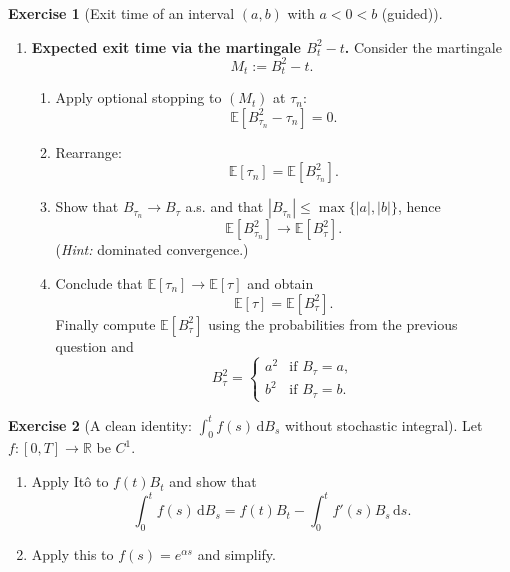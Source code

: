 \documentclass[11pt]{article}
\newcommand{\E}{\mathbb{E}}
\newcommand{\R}{\mathbb{R}}
\newcommand{\1}{\mathbf{1}}
\theoremstyle{definition}
\newtheorem{exercise}{Exercise}[section]
\begin{document}
\begin{exercise}[Exit time of an interval $(a,b)$ with $a<0<b$ (guided)]
\begin{enumerate}[label=\textbf{(\alph*)}, itemsep=0.35em]
\item \textbf{Expected exit time via the martingale $B_t^2-t$.}
Consider the martingale
$$
M_t:=B_t^2-t.
$$
\begin{enumerate}[label=\roman*)]
\item Apply optional stopping to $(M_t)$ at $\tau_n$:
$$
\E[B_{\tau_n}^2-\tau_n]=0.
$$
\item Rearrange:
$$
\E[\tau_n]=\E[B_{\tau_n}^2].
$$
\item Show that $B_{\tau_n}\to B_\tau$ a.s. and that $|B_{\tau_n}|\le \max\{|a|,|b|\}$, hence
$$
\E[B_{\tau_n}^2]\to \E[B_\tau^2].
$$
(\emph{Hint:} dominated convergence.)
\item Conclude that $\E[\tau_n]\to \E[\tau]$ and obtain
$$
\E[\tau]=\E[B_\tau^2].
$$
Finally compute $\E[B_\tau^2]$ using the probabilities from the previous question and
$$
B_\tau^2=
\begin{cases}
a^2 & \text{if } B_\tau=a,\\
b^2 & \text{if } B_\tau=b.
\end{cases}
$$
\end{enumerate}

\end{enumerate}
\end{exercise}


\begin{exercise}[A clean identity: $\int_0^t f(s)\,\mathrm{d} B_s$ without stochastic integral]
Let $f:[0,T]\to\R$ be $C^1$.
\begin{enumerate}
\item Apply It\^o to $f(t)B_t$ and show that
$$
\int_0^t f(s)\,\mathrm{d} B_s = f(t)B_t-\int_0^t f'(s)B_s\,\mathrm{d} s.
$$
\item Apply this to $f(s)=e^{\alpha s}$ and simplify.
\end{enumerate}
\end{exercise}
\end{document}
